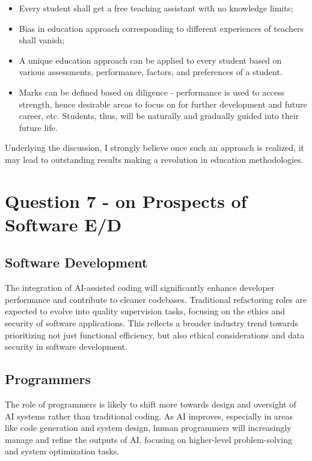 \documentclass[12pt,a4paper]{article}
\begin{document}
\begin{itemize}
    \item Every student shall get a free teaching assistant with no knowledge limits;
    \item Bias in education approach corresponding to different experiences of teachers shall vanish;
    \item A unique education approach can be applied to every student based on various assessments, performance, factors, and preferences of a student.
    \item Marks can be defined based on diligence - performance is used to access strength, hence desirable areas to focus on for further development and future career, etc. Students, thus, will be naturally and gradually guided into their future life.
\end{itemize}

Underlying the discussion, I strongly believe once such an approach is realized, it may lead to outstanding results making a revolution in education methodologies.

\section{Question 7 - on Prospects of Software E/D}

\subsection{Software Development}
The integration of AI-assisted coding will significantly enhance developer performance and contribute to cleaner codebases. Traditional refactoring roles are expected to evolve into quality supervision tasks, focusing on the ethics and security of software applications. This reflects a broader industry trend towards prioritizing not just functional efficiency, but also ethical considerations and data security in software development.

\subsection{Programmers}
The role of programmers is likely to shift more towards design and oversight of AI systems rather than traditional coding. As AI improves, especially in areas like code generation and system design, human programmers will increasingly manage and refine the outputs of AI, focusing on higher-level problem-solving and system optimization tasks.
\end{document}
